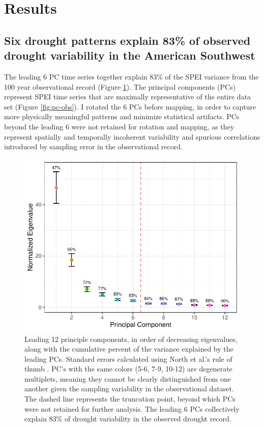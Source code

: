 \documentclass[10pt]{iopart}
\begin{document}
\section*{Results}

\subsection*{Six drought patterns explain 83\% of observed drought variability in the American Southwest}
The leading 6 PC time series together explain 83\% of the SPEI variance from the 100 year observational record (Figure \ref{fig:scree}). The principal components (PCs) represent SPEI time series that are maximally representative of the entire data set (Figure \ref{fig:pc-obs}). I rotated the 6 PCs before mapping, in order to capture more physically meaningful patterns and minimize statistical artifacts. PCs beyond the leading 6 were not retained for rotation and mapping, as they represent spatially and temporally incoherent variability and spurious correlations introduced by sampling error in the observational record. 

\begin{figure}[!htb]
\centering
\includegraphics[width=\linewidth]{figures/scree.pdf}
\caption{Leading 12 principle components, in order of decreasing eigenvalues, along with the cumulative percent of the variance explained by the leading PCs. Standard errors calculated using North et al.'s rule of thumb \parencite{North1982}. PC's with the same colors (5-6, 7-9, 10-12) are degenerate multiplets, meaning they cannot be clearly distinguished from one another given the sampling variability in the observational dataset. The dashed line represents the truncation point, beyond which PCs were not retained for further analysis. The leading 6 PCs collectively explain 83\% of drought variability in the observed drought record.}
\label{fig:scree}
\end{figure}
\end{document}
